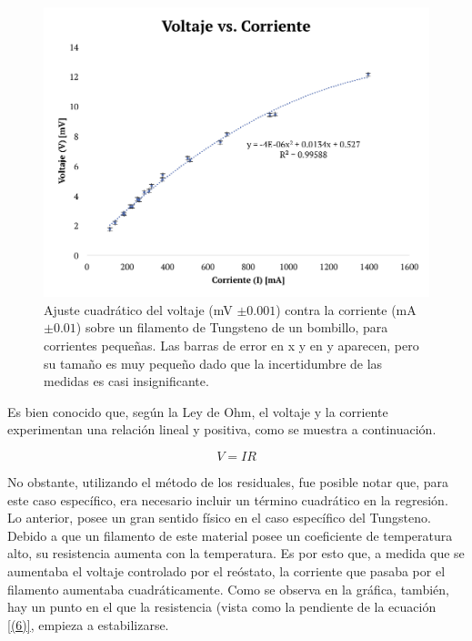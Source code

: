 \documentclass[%
 reprint,
 amsmath,amssymb,
 aps,
]{revtex4-1}
\begin{document}
\begin{figure}[H]
    \centering
    \includegraphics[scale= 0.5]{VvsI.png}
    \caption{Ajuste cuadrático del voltaje (mV $\pm 0.001$) contra la corriente (mA $\pm 0.01$) sobre un filamento de Tungsteno de un bombillo, para corrientes pequeñas. Las barras de error en x y en y aparecen, pero su tamaño es muy pequeño dado que la incertidumbre de las medidas es casi insignificante.}
    \label{fig:Figura 4}
\end{figure}

Es bien conocido que, según la Ley de Ohm, el voltaje y la corriente experimentan una relación lineal y positiva, como se muestra a continuación.

\begin{equation}\label{(6)}
    V = {I}{R}
\end{equation}

No obstante, utilizando el método de los residuales, fue posible notar que, para este caso específico, era necesario incluir un término cuadrático en la regresión. Lo anterior, posee un gran sentido físico en el caso específico del Tungsteno. Debido a que un filamento de este material posee un coeficiente de temperatura alto, su resistencia aumenta con la temperatura. Es por esto que, a medida que se aumentaba el voltaje controlado por el reóstato, la corriente que pasaba por el filamento aumentaba cuadráticamente. Como se observa en la gráfica, también, hay un punto en el que la resistencia (vista como la pendiente de la ecuación \ref{(6)}, empieza a estabilizarse. \\ 
\end{document}
